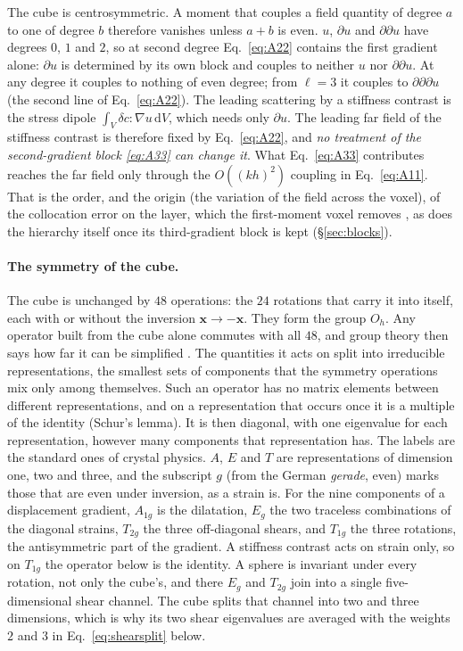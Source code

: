 \documentclass[11pt,a4paper]{article}
\newcommand{\dd}{\mathrm{d}}
\begin{document}
The cube is centrosymmetric. A moment that couples a field quantity of degree $a$ to one of degree
$b$ therefore vanishes unless $a+b$ is even. $u$, $\partial u$ and $\partial\partial u$ have
degrees $0$, $1$ and $2$, so at second degree Eq.~\eqref{eq:A22} contains the first gradient alone:
$\partial u$ is determined by its own block and couples to neither $u$ nor $\partial\partial u$. At
any degree it couples to nothing of even degree; from $\ell=3$ it couples to $\partial\partial\partial u$
(the second line of Eq.~\eqref{eq:A22}). The leading
scattering by a stiffness contrast is the stress dipole $\int_V\delta c:\nabla u\,\dd V$, which needs
only $\partial u$. The leading far field of the stiffness contrast is therefore fixed by
Eq.~\eqref{eq:A22}, and \emph{no treatment of the second-gradient block \eqref{eq:A33} can change
it}. What Eq.~\eqref{eq:A33} contributes reaches the far field only through the $O((kh)^2)$
coupling in Eq.~\eqref{eq:A11}. That is the order, and the origin (the variation of the field
across the voxel), of the collocation error on the layer, which the first-moment
voxel removes \citep{NestorError2026}, as does the hierarchy itself once its third-gradient block is kept
(\S\ref{sec:blocks}).

\paragraph{The symmetry of the cube.} The cube is unchanged by $48$ operations: the $24$ rotations
that carry it into itself, each with or without the inversion $\mathbf x\to-\mathbf x$. They form the
group $O_h$. Any operator built from the cube alone commutes with all $48$, and group theory then says
how far it can be simplified \citep{Tinkham1964,Dresselhaus2008}. The quantities it acts on split into
irreducible representations, the smallest sets of components that the symmetry operations mix only among
themselves. Such an operator has no matrix elements between different representations, and on a
representation that occurs once it is a multiple of the identity (Schur's lemma). It is then diagonal,
with one eigenvalue for each representation, however many components that representation has. The
labels are the standard ones of crystal physics. $A$, $E$ and $T$ are representations of dimension one,
two and three, and the subscript $g$ (from the German \emph{gerade}, even) marks those that are even under
inversion, as a strain is. For the nine components of a displacement gradient, $A_{1g}$ is the dilatation,
$E_g$ the two traceless combinations of the diagonal strains, $T_{2g}$ the three off-diagonal shears, and
$T_{1g}$ the three rotations, the antisymmetric part of the gradient. A stiffness contrast acts on strain
only, so on $T_{1g}$ the operator below is the identity. A sphere is invariant under every rotation, not
only the cube's, and there $E_g$ and $T_{2g}$ join into a single five-dimensional shear channel. The cube
splits that channel into two and three dimensions, which is why its two shear eigenvalues are averaged
with the weights $2$ and $3$ in Eq.~\eqref{eq:shearsplit} below.
\end{document}

